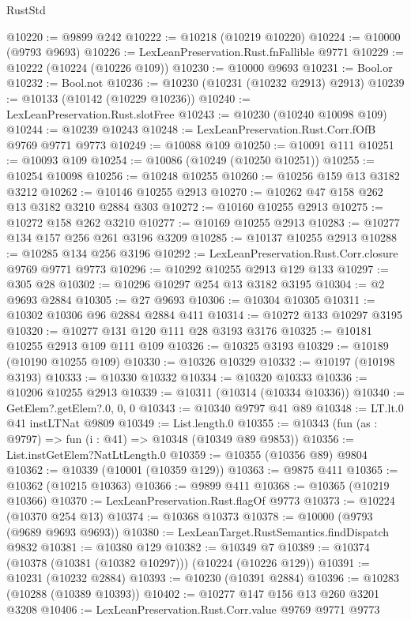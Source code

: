 \begin{lexlean}{RustStd}
\begin{coremodule}
@10220 := @9899 @242
@10222 := @10218 (@10219 @10220)
@10224 := @10000 (@9793 @9693)
@10226 := LexLeanPreservation.Rust.fnFallible @9771
@10229 := @10222 (@10224 (@10226 @109))
@10230 := @10000 @9693
@10231 := Bool.or
@10232 := Bool.not
@10236 := @10230 (@10231 (@10232 @2913) @2913)
@10239 := @10133 (@10142 (@10229 @10236))
@10240 := LexLeanPreservation.Rust.slotFree
@10243 := @10230 (@10240 @10098 @109)
@10244 := @10239 @10243
@10248 := LexLeanPreservation.Rust.Corr.fOfB @9769 @9771 @9773
@10249 := @10088 @109
@10250 := @10091 @111
@10251 := @10093 @109
@10254 := @10086 (@10249 (@10250 @10251))
@10255 := @10254 @10098
@10256 := @10248 @10255
@10260 := @10256 @159 @13 @3182 @3212
@10262 := @10146 @10255 @2913
@10270 := @10262 @47 @158 @262 @13 @3182 @3210 @2884 @303
@10272 := @10160 @10255 @2913
@10275 := @10272 @158 @262 @3210
@10277 := @10169 @10255 @2913
@10283 := @10277 @134 @157 @256 @261 @3196 @3209
@10285 := @10137 @10255 @2913
@10288 := @10285 @134 @256 @3196
@10292 := LexLeanPreservation.Rust.Corr.closure @9769 @9771 @9773
@10296 := @10292 @10255 @2913 @129 @133
@10297 := @305 @28
@10302 := @10296 @10297 @254 @13 @3182 @3195
@10304 := @2 @9693 @2884
@10305 := @27 @9693
@10306 := @10304 @10305
@10311 := @10302 @10306 @96 @2884 @2884 @411
@10314 := @10272 @133 @10297 @3195
@10320 := @10277 @131 @120 @111 @28 @3193 @3176
@10325 := @10181 @10255 @2913 @109 @111 @109
@10326 := @10325 @3193
@10329 := @10189 (@10190 @10255 @109)
@10330 := @10326 @10329
@10332 := @10197 (@10198 @3193)
@10333 := @10330 @10332
@10334 := @10320 @10333
@10336 := @10206 @10255 @2913
@10339 := @10311 (@10314 (@10334 @10336))
@10340 := GetElem?.getElem?.{0, 0, 0}
@10343 := @10340 @9797 @41 @89
@10348 := LT.lt.{0} @41 instLTNat @9809
@10349 := List.length.{0}
@10355 := @10343 (fun (as : @9797) => fun (i : @41) => @10348 (@10349 @89 @9853))
@10356 := List.instGetElem?NatLtLength.{0}
@10359 := @10355 (@10356 @89) @9804
@10362 := @10339 (@10001 (@10359 @129))
@10363 := @9875 @411
@10365 := @10362 (@10215 @10363)
@10366 := @9899 @411
@10368 := @10365 (@10219 @10366)
@10370 := LexLeanPreservation.Rust.flagOf @9773
@10373 := @10224 (@10370 @254 @13)
@10374 := @10368 @10373
@10378 := @10000 (@9793 (@9689 @9693 @9693))
@10380 := LexLeanTarget.RustSemantics.findDispatch @9832
@10381 := @10380 @129
@10382 := @10349 @7
@10389 := @10374 (@10378 (@10381 (@10382 @10297))) (@10224 (@10226 @129))
@10391 := @10231 (@10232 @2884)
@10393 := @10230 (@10391 @2884)
@10396 := @10283 (@10288 (@10389 @10393))
@10402 := @10277 @147 @156 @13 @260 @3201 @3208
@10406 := LexLeanPreservation.Rust.Corr.value @9769 @9771 @9773

\end{coremodule}
\end{lexlean}
